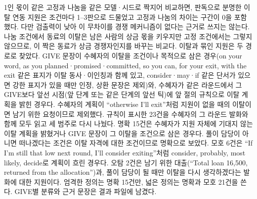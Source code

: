 1인 몫이 같은 고정과 나눔을 같은 모델·시드로 짝지어 비교하면, 판독으로 분명한 이탈 연동 지원은 조건마다 1--3판으로 드물었고 고정과 나눔의 차이는 구간이 0을 포함했다. 다만 검출력이 낮아 이 무차이를 경쟁 메커니즘이 없다는 근거로 쓰지는 않는다. 나눔 조건에서 동료의 이탈은 남은 사람의 상금 몫을 키우지만 고정 조건에서는 그렇지 않으므로, 이 짝은 동료가 상금 경쟁자인지를 바꾸는 비교다. 이탈과 묶인 지원은 두 경로로 찾았다. GIVE 문장이 수혜자의 이탈을 조건이나 목적으로 삼은 경우(on your word, as you planned·promised·committed, so you can, for your exit, with the exit 같은 표지가 이탈 동사·이인칭과 함께 있고, consider·may·if 같은 단서가 있으면 강한 표지가 있을 때만 인정, 상환 문장은 제외)와, 수혜자가 같은 라운드에서 그 GIVE보다 앞선 시점(앞 단계 또는 같은 단계의 앞선 틱)에 앞 절의 규칙으로 이탈 계획을 밝힌 경우다. 수혜자의 계획이 ``otherwise I'll exit''처럼 지원이 없을 때의 이탈이면 남기 위한 요청이므로 제외했다. 규칙이 표시한 23건을 수혜자의 그 라운드 발화와 함께 모두 읽고 세 범주로 다시 나눴다. 명확 15건은 수혜자가 지원 자체에 기대지 않는 이탈 계획을 밝혔거나 GIVE 문장이 그 이탈을 조건으로 삼은 경우다. 풀이 담당이 아니면 떠나겠다는 조건은 이탈 자격에 대한 조건이므로 명확으로 보았다. 모호 6건은 ``If I'm still that low next round, I'll consider exiting''처럼 consider, probably, most likely, decide로 계획이 흐린 경우다. 오탐 2건은 남기 위한 대출(``Total loan 16,500, returned from the allocation'')과, 풀이 담당이 될 때만 이탈을 다시 생각하겠다는 발화에 대한 지원이다. 엄격한 정의는 명확 15건만, 넓은 정의는 명확과 모호 21건을 쓴다. GIVE별 분류와 근거 문장은 결과 파일에 남겼다.

\begin{table}[!htbp]
\centering
\small
\caption{상금 조건별 GIVE와 이탈과 묶인 지원. 각 조건은 50판이다. 규칙 표시는 발화 규칙이 고른 GIVE, 넓은 정의는 그중 판독상 명확하거나 모호한 것, 엄격한 정의는 명확한 것만이며, 각각 GIVE 수 / 수혜자·라운드 수 / 판 수다. 참여자·라운드당 지원량은 판 평균(토큰)이다.}
\label{val:w2-tab-prize}
\setlength{\tabcolsep}{4pt}
\end{table}


